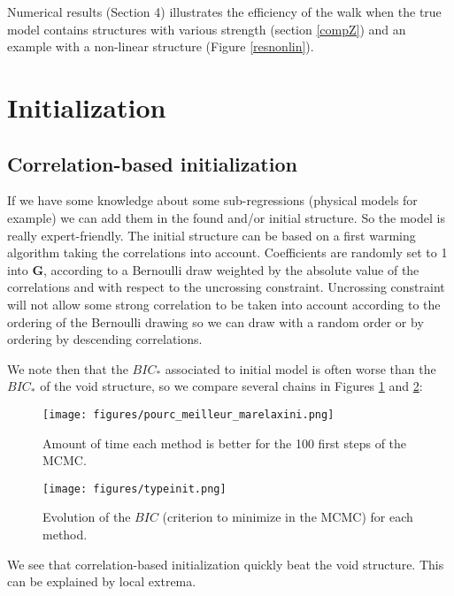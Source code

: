 \documentclass[12pt,a4paper]{report}
\begin{document}
Numerical results (Section 4) illustrates the efficiency of the walk when the true model contains structures with various strength (section \ref{compZ}) and an example with a non-linear structure (Figure \ref{resnonlin}).
		
		
		
	\section{Initialization}
		\subsection{Correlation-based initialization}
		 If we have some knowledge about some sub-regressions (physical models for example) we can add them in the found and/or initial structure. So the model is really expert-friendly.
The initial structure can be based on a first warming algorithm taking the correlations into account. Coefficients are randomly set to 1 into $\boldsymbol{G}$, according to a Bernoulli draw weighted by the absolute value of the correlations and with respect to the uncrossing constraint. Uncrossing constraint will not allow some strong correlation to be taken into account according to the ordering of the Bernoulli drawing so we can draw with a random order or by ordering by descending correlations. 
		
		We note then that the $BIC_*$ associated to initial model is often worse than the $BIC_*$ of the void structure, so we compare several chains in Figures \ref{pourcini} and \ref{Bicini}:			
			
	\begin{center}
		\begin{figure}[h!]
		\centering
		\texttt{[image: figures/pourc\_meilleur\_marelaxini.png]} 
		\caption{Amount of time each method is better for the 100 first steps of the MCMC. } \label{pourcini}
		\end{figure}		
	\end{center}
	
	\begin{center}
		\begin{figure}[h!]
		\centering
		\texttt{[image: figures/typeinit.png]} %
		\caption{Evolution of the $BIC$ (criterion to minimize in the MCMC) for each method.}\label{Bicini}
		\end{figure}
	\end{center}
	We see that correlation-based initialization quickly beat the void structure. This can be explained by local extrema.
	\FloatBarrier
\end{document}

